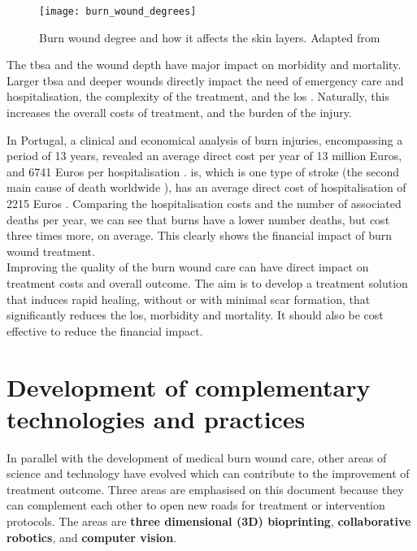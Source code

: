 \begin{figure}[htbp]
	\centering
	\texttt{[image: burn\_wound\_degrees]}
	\caption{Burn wound degree and how it affects the skin layers. Adapted from \cite{Tortora2009_principles_anatomy_physiology}}
	\label{fig:burn_wound_degrees}
\end{figure}

The \gls{tbsa} and the wound depth have major impact on morbidity and mortality. Larger \gls{tbsa} and deeper wounds directly impact the need of emergency care and hospitalisation, the complexity of the treatment, and the \gls{los} \cite{Santos_2016_burden_burns_portugal, Bartosch_2013_mortality_lengthofstay}. Naturally, this increases the overall costs of treatment, and the burden of the injury. 

In Portugal, a clinical and economical analysis of burn injuries, encompassing a period of 13 years, revealed an average direct cost per year of 13 million Euros, and 6741 Euros per hospitalisation \cite{Santos_2016_burden_burns_portugal}. \gls{is}, which is one type of stroke (the second main cause of death worldwide \cite{GHE2016_xls}), has an average direct cost of hospitalisation of 2215 Euros \cite{Santos_2017_atrial_fibrillation_stroke}. Comparing the hospitalisation costs and the number of associated deaths per year, we can see that burns have a lower number deaths, but cost three times more, on average. This clearly shows the financial impact of burn wound treatment. \\

Improving the quality of the burn wound care can have direct impact on treatment costs and overall outcome. The aim is to develop a treatment solution that induces rapid healing, without or with minimal scar formation, that significantly reduces the \gls{los}, morbidity and mortality. It should also be cost effective to reduce the financial impact. 


\section{Development of complementary technologies and practices} %
\label{sec:development_of_complementary_technologies_and_practices}

In parallel with the development of medical burn wound care, other areas of science and technology have evolved which can contribute to the improvement of treatment outcome. Three areas are emphasised on this document because they can complement each other to open new roads for treatment or intervention protocols. The areas are \textbf{three dimensional (3D) bioprinting}, \textbf{collaborative robotics}, and \textbf{computer vision}.


